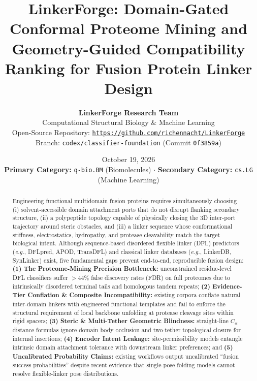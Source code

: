 \documentclass[11pt]{article}
\title{LinkerForge: Domain-Gated Conformal Proteome Mining and Geometry-Guided Compatibility Ranking for Fusion Protein Linker Design}
\author{
  \textbf{LinkerForge Research Team} \\
  Computational Structural Biology \& Machine Learning \\
  Open-Source Repository: \texttt{\href{https://github.com/richennacht/LinkerForge}{https://github.com/richennacht/LinkerForge}} \\
  Branch: \texttt{codex/classifier-foundation} (Commit \texttt{0f3859a})
}
\date{October 19, 2026 \\ \vspace{0.4em} \textbf{Primary Category:} \texttt{q-bio.BM} (Biomolecules) $\cdot$ \textbf{Secondary Category:} \texttt{cs.LG} (Machine Learning)}
\begin{document}
\maketitle

\begin{abstract}
Engineering functional multidomain fusion proteins requires simultaneously choosing (i) solvent-accessible domain attachment ports that do not disrupt flanking secondary structure, (ii) a polypeptide topology capable of physically closing the 3D inter-port trajectory around steric obstacles, and (iii) a linker sequence whose conformational stiffness, electrostatics, hydropathy, and protease cleavability match the target biological intent. Although sequence-based disordered flexible linker (DFL) predictors (\emph{e.g.}, DFLpred, APOD, TransDFL) and classical linker databases (\emph{e.g.}, LinkerDB, SynLinker) exist, five fundamental gaps prevent end-to-end, reproducible fusion design: \textbf{(1) The Proteome-Mining Precision Bottleneck:} unconstrained residue-level DFL classifiers suffer $>44\%$ false discovery rates (FDR) on full proteomes due to intrinsically disordered terminal tails and homologous tandem repeats; \textbf{(2) Evidence-Tier Conflation \& Composite Incompatibility:} existing corpora conflate natural inter-domain linkers with engineered functional templates and fail to enforce the structural requirement of local backbone unfolding at protease cleavage sites within rigid spacers; \textbf{(3) Steric \& Multi-Tether Geometric Blindness:} straight-line $C_\alpha$ distance formulas ignore domain body occlusion and two-tether topological closure for internal insertions; \textbf{(4) Encoder Intent Leakage:} site-permissibility models entangle intrinsic domain attachment tolerance with downstream linker preferences; and \textbf{(5) Uncalibrated Probability Claims:} existing workflows output uncalibrated ``fusion success probabilities'' despite recent evidence that single-pose folding models cannot resolve flexible-linker pose distributions.


\end{abstract}
\end{document}
